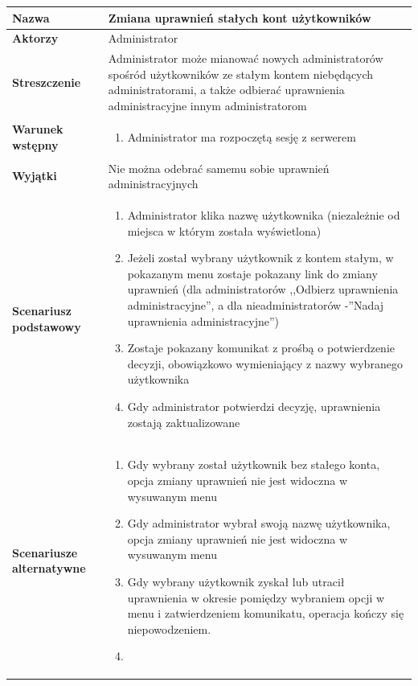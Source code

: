 \documentclass[11pt,oneside,a4paper,titlepage,onecolumn]{article}
\newenvironment{enumreq}
{ \begin{enumerate}[topsep=0pt,itemsep=-1ex,partopsep=1ex,parsep=1ex] }
{ \end{enumerate}                  }
\begin{document}
{\begin{tabular}{ | l | l | }
	\hline
		\textbf{Nazwa} & 
		Zmiana uprawnień stałych kont użytkowników
		\\
		
	\hline
		\textbf{Aktorzy} & \parbox[t]{11cm}{
			Administrator
		}\\
		 
	\hline
		\parbox[t]{4cm}{\textbf{Streszczenie}} & \parbox[t]{11cm}{
			Administrator może mianować nowych administratorów spośród
			użytkowników ze stałym kontem niebędących administratorami, a
			także odbierać uprawnienia administracyjne innym administratorom
			
		}\\
		
	\hline
		\parbox[t]{4cm}{\textbf{Warunek wstępny}} & \parbox[t]{11cm}{
			\begin{enumreq}
				\item Administrator ma rozpoczętą sesję z serwerem
			\end{enumreq}
				
		}
		\\
		
	\hline
		\parbox[t]{4cm}{\textbf{Wyjątki}} & \parbox[t]{11cm}{
			Nie można odebrać samemu sobie uprawnień administracyjnych
			
		}
		\\

	\hline
		\parbox[t]{4cm}{\textbf{Scenariusz podstawowy}} & \parbox[t]{11cm}{
			\begin{enumreq}
				\item Administrator klika nazwę użytkownika (niezależnie
				od miejsca w którym została wyświetlona)
				\item Jeżeli został wybrany użytkownik z kontem stałym,
				w pokazanym menu zostaje pokazany link do zmiany
				uprawnień (dla administratorów ,,Odbierz uprawnienia 
				administracyjne'', a dla nieadministratorów -''Nadaj
				uprawnienia administracyjne'')
				\item Zostaje pokazany komunikat z prośbą o potwierdzenie
				decyzji, obowiązkowo wymieniający z nazwy wybranego
				użytkownika
				\item Gdy administrator potwierdzi decyzję, uprawnienia
				zostają zaktualizowane
			\end{enumreq}
		}
		\\
		
	\hline
		\parbox[t]{4cm}{\textbf{Scenariusze alternatywne}} & \parbox[t]
		{11cm}{
			\begin{enumreq}
				\item Gdy wybrany został użytkownik bez stałego konta,
				opcja zmiany uprawnień nie jest widoczna w wysuwanym menu
				\item Gdy administrator wybrał swoją nazwę użytkownika,
				opcja zmiany uprawnień nie jest widoczna w wysuwanym menu
				\item Gdy wybrany użytkownik zyskał lub utracił uprawnienia
				w okresie pomiędzy wybraniem opcji w menu i zatwierdzeniem
				komunikatu, operacja kończy się niepowodzeniem.
				\item 
			\end{enumreq}
		}
		\\
		

\end{tabular}}
\end{document}
